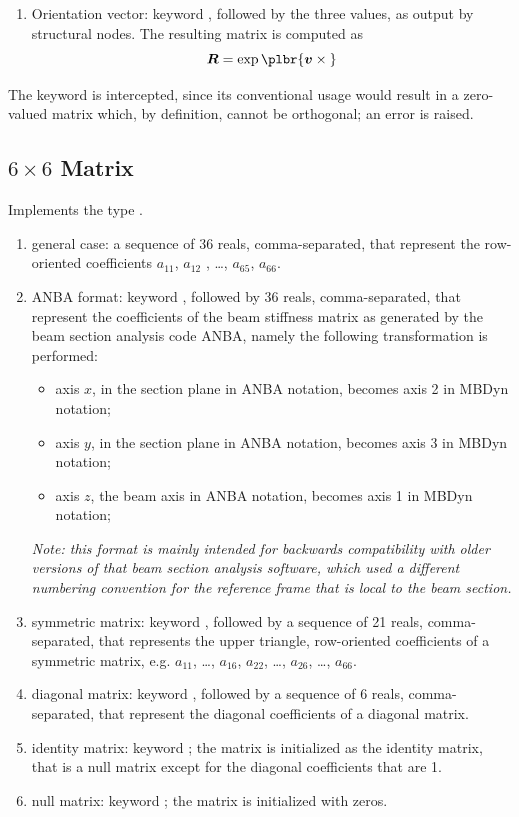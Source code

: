 \begin{enumerate}
\item Orientation vector: keyword , followed by the three
values, as output by structural nodes.
The resulting matrix is computed as
\begin{equation}
	\T{R} = \exp\plbr{\T{v}\times{}}
\end{equation}
\end{enumerate}

The keyword  is intercepted, since its conventional usage
would result in a zero-valued matrix which, by definition, cannot be orthogonal;
an error is raised.

\subsection{$6 \times 6$ Matrix}
\label{sec:Mat6x6}
Implements the type .
\begin{enumerate}
    \item general case: a sequence of 36 reals, comma-separated, that
    represent the row-oriented coefficients $ a_{11} $, $ a_{12}$ ,
    \ldots, $ a_{65} $, $ a_{66} $.
    \item ANBA format: keyword , followed by 36 reals, 
    comma-separated, that represent the coefficients of the beam stiffness
    matrix as generated by the beam section analysis code ANBA,
    namely the following transformation is performed:
    \begin{itemize}
        \item axis $ x $, in the section plane in ANBA notation, 
	becomes axis 2 in MBDyn notation;    
	\item axis $ y $, in the section plane in ANBA notation, 
	becomes axis 3 in MBDyn notation;    
	\item axis $ z $, the beam axis in ANBA notation, 
	becomes axis 1 in MBDyn notation;    
    \end{itemize}
    \emph{Note: this format is mainly intended for backwards compatibility
    with older versions of that beam section analysis software,
    which used a different numbering convention for the reference frame
    that is local to the beam section.}
    \item symmetric matrix: keyword , followed by a sequence
    of 21 reals, comma-separated, that represents the upper triangle,
    row-oriented coefficients of a symmetric matrix, 
    e.g. $ a_{11} $, \ldots , $ a_{16} $, $ a_{22} $,
    \ldots , $ a_{26} $, \ldots, $ a_{66} $.
    \item diagonal matrix: keyword , followed by a sequence
    of 6 reals, comma-separated, that represent the diagonal coefficients 
    of a diagonal matrix.
    \item identity matrix: keyword ; the matrix is initialized
    as the identity matrix, that is a null matrix except for the diagonal 
    coefficients that are 1.
    \item null matrix: keyword ; the matrix is initialized 
    with zeros.
\end{enumerate}
